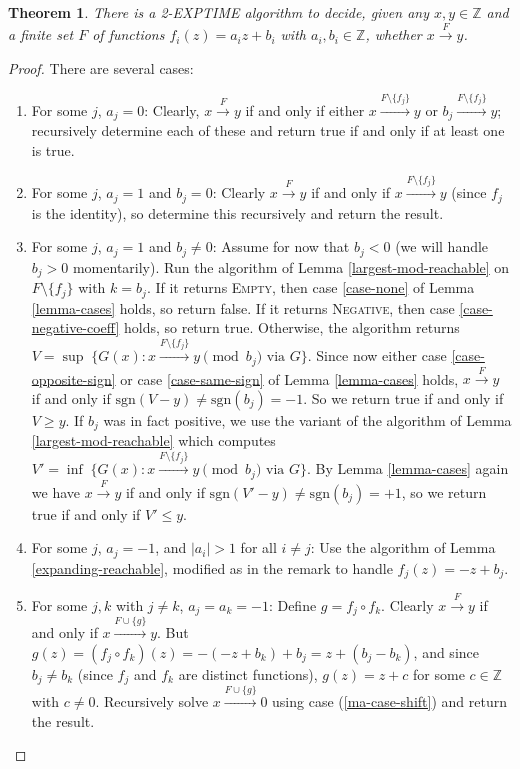\documentclass[11pt]{amsart}
\newcommand{\Z}{\mathbb{Z}}
\newcommand{\sgn}[1]{\mathrm{sgn}(#1)}
\newtheorem{theorem}{Theorem}
\theoremstyle{definition}
\theoremstyle{remark}
\begin{document}
\begin{theorem} \label{main-algorithm}
There is a \textsf{2-EXPTIME} algorithm to decide, given any $x, y \in \Z$ and a finite set $F$ of functions $f_i(z) = a_i z + b_i$ with $a_i, b_i \in \Z$, whether $x \xrightarrow{F} y$.
\end{theorem}
\begin{proof}
There are several cases:
\begin{enumerate}
\item For some $j$, $a_j = 0$: Clearly, $x \xrightarrow{F} y$ if and only if either $x \xrightarrow{F \setminus \{f_j\}} y$ or $b_j \xrightarrow{F \setminus \{f_j\}} y$; recursively determine each of these and return true if and only if at least one is true. \label{ma-case-constant}
\item For some $j$, $a_j = 1$ and $b_j = 0$: Clearly $x \xrightarrow{F} y$ if and only if $x \xrightarrow{F \setminus \{f_j\}} y$ (since $f_j$ is the identity), so determine this recursively and return the result. \label{ma-case-identity}
\item For some $j$, $a_j = 1$ and $b_j \ne 0$: Assume for now that $b_j < 0$ (we will handle $b_j > 0$ momentarily). Run the algorithm of Lemma \ref{largest-mod-reachable} on $F \setminus \{f_j\}$ with $k = b_j$. If it returns \textsc{Empty}, then case \ref{case-none} of Lemma \ref{lemma-cases} holds, so return false. If it returns \textsc{Negative}, then case \ref{case-negative-coeff} holds, so return true. Otherwise, the algorithm returns $V = \sup \; \{ G(x) : x \xrightarrow{F \setminus \{f_j\}} y \pmod {b_j} \text{ via } G \}$. Since now either case \ref{case-opposite-sign} or case \ref{case-same-sign} of Lemma \ref{lemma-cases} holds, $x \xrightarrow{F} y$ if and only if $\sgn{V - y} \ne \sgn{b_j} = -1$. So we return true if and only if $V \ge y$. If $b_j$ was in fact positive, we use the variant of the algorithm of Lemma \ref{largest-mod-reachable} which computes $V' = \inf \; \{ G(x) : x \xrightarrow{F \setminus \{f_j\}} y \pmod {b_j} \text{ via } G \}$. By Lemma \ref{lemma-cases} again we have $x \xrightarrow{F} y$ if and only if $\sgn{V' - y} \ne \sgn{b_j} = +1$, so we return true if and only if $V' \le y$. \label{ma-case-shift}
\item For some $j$, $a_j = -1$, and $|a_i| > 1$ for all $i \ne j$: Use the algorithm of Lemma \ref{expanding-reachable}, modified as in the remark to handle $f_j(z) = -z + b_j$. \label{ma-case-involution}
\item For some $j, k$ with $j \ne k$, $a_j = a_k = -1$: Define $g = f_j \circ f_k$. Clearly $x \xrightarrow{F} y$ if and only if $x \xrightarrow{F \cup \{g\}} y$. But $g(z) = (f_j \circ f_k)(z) = -(-z+b_k)+b_j = z + (b_j - b_k)$, and since $b_j \ne b_k$ (since $f_j$ and $f_k$ are distinct functions), $g(z) = z + c$ for some $c \in \Z$ with $c \ne 0$. Recursively solve $x \xrightarrow{F \cup \{g\}} 0$ using case (\ref{ma-case-shift}) and return the result. \label{ma-case-two-involutions}

\end{enumerate}
\end{proof}
\end{document}
